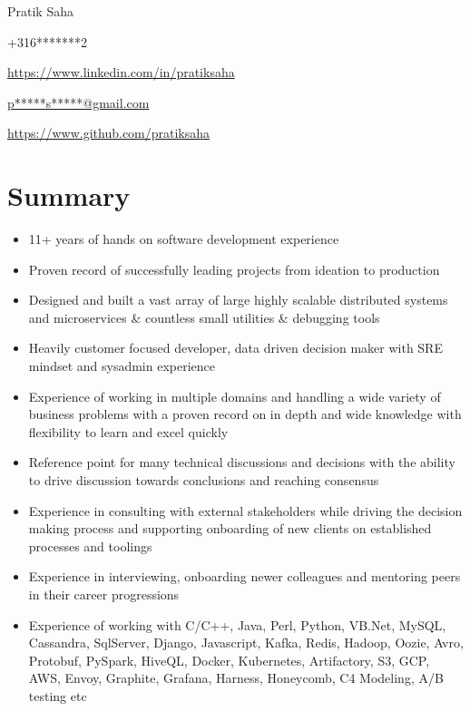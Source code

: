 \documentclass{article}
\begin{document}
\begin{center}\selectfont\Large Pratik Saha\end{center}

{\raggedright \Mobilefone \space +316*******2} \hfill {\raggedleft \faLinkedin \space \href{https://www.linkedin.com/in/pratiksaha}{https://www.linkedin.com/in/pratiksaha}}

{\raggedright {} \space \href{mailto:p*****s*****@gmail.com}{p*****s*****@gmail.com}} \hfill {\raggedleft \faGithub \space  \href{https://www.github.com/pratiksaha}{https://www.github.com/pratiksaha}}

\section{Summary}
\begin{itemize}[noitemsep,nolistsep]
\item 11+ years of hands on software development experience
\item Proven record of successfully leading projects from ideation to production
\item Designed and built a vast array of large highly scalable distributed systems and microservices \& countless small utilities \& debugging tools
\item Heavily customer focused developer, data driven decision maker with SRE mindset and sysadmin experience
\item Experience of working in multiple domains and handling a wide variety of business problems with a proven record on in depth and wide knowledge with flexibility to learn and excel quickly
\item Reference point for many technical discussions and decisions with the ability to drive discussion towards conclusions and reaching consensus
\item Experience in consulting with external stakeholders while driving the decision making process and supporting onboarding of new clients on established processes and toolings
\item Experience in interviewing, onboarding newer colleagues and mentoring peers in their career progressions
\item Experience of working with C/C++, Java, Perl, Python, VB.Net, MySQL, Cassandra, SqlServer, Django, Javascript, Kafka, Redis, Hadoop, Oozie, Avro, Protobuf, PySpark, HiveQL, Docker, Kubernetes, Artifactory, S3, GCP, AWS, Envoy, Graphite, Grafana, Harness, Honeycomb, C4 Modeling, A/B testing etc
\end{itemize}
\end{document}
